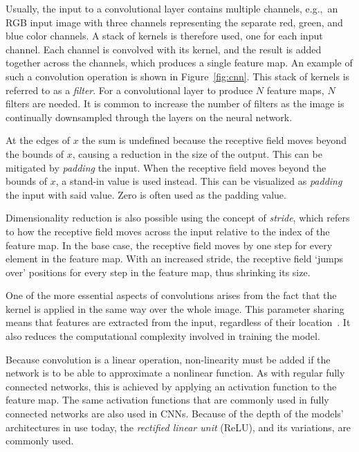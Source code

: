 Usually, the input to a convolutional layer contains multiple channels, e.g.,\ an RGB input image with three channels representing the separate red, green, and blue color channels.
A stack of kernels is therefore used, one for each input channel.
Each channel is convolved with its kernel, and the result is added together across the channels, which produces a single feature map.
An example of such a convolution operation is shown in Figure~\ref{fig:cnn}.
This stack of kernels is referred to as a \textit{filter}.
For a convolutional layer to produce \(N\) feature maps, \(N\) filters are needed.
It is common to increase the number of filters as the image is continually downsampled through the layers on the neural network.

At the edges of \(x\) the sum is undefined because the receptive field moves beyond the bounds of \(x\), causing a reduction in the size of the output.
This can be mitigated by \textit{padding} the input.
When the receptive field moves beyond the bounds of \(x\), a stand-in value is used instead.
This can be visualized as \textit{padding} the input with said value.
Zero is often used as the padding value.

Dimensionality reduction is also possible using the concept of \textit{stride}, which refers to how the receptive field moves across the input relative to the index of the feature map.
In the base case, the receptive field moves by one step for every element in the feature map.
With an increased stride, the receptive field `jumps over' positions for every step in the feature map, thus shrinking its size.

One of the more essential aspects of convolutions arises from the fact that the kernel is applied in the same way over the whole image.
This parameter sharing means that features are extracted from the input, regardless of their location\ \parencite{lecum1989}.
It also reduces the computational complexity involved in training the model.

Because convolution is a linear operation, non-linearity must be added if the network is to be able to approximate a nonlinear function.
As with regular fully connected networks, this is achieved by applying an activation function to the feature map.
The same activation functions that are commonly used in fully connected networks are also used in CNNs.
Because of the depth of the models’ architectures in use today, the \textit{rectified linear unit} (ReLU), and its variations, are commonly used.

